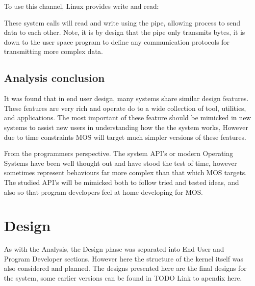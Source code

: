 \documentclass[a4paper]{report}
\begin{document}
To use this channel, Linux provides write and read: \cite{manWrite} \cite{manRead}

These system calls will read and write using the pipe, allowing process to send data to each other. Note, it is by design that the pipe only transmits bytes, it is down to the user space program to define any communication protocols for transmitting more complex data.

\section{Analysis conclusion}

It was found that in end user design, many systems share similar design features. These features are very rich and operate do to a wide collection of tool, utilities, and applications. The most important of these feature should be mimicked in new systems to assist new users in understanding how the the system works, However due to time constraints MOS will target much simpler versions of these features.

From the programmers perspective. The system API's or modern Operating Systems have been well thought out and have stood the test of time, however sometimes represent behaviours far more complex than that which MOS targets. The studied API's will be mimicked both to follow tried and tested ideas, and also so that program developers feel at home developing for MOS.


































\chapter{Design}

As with the Analysis, the Design phase was separated into End User and Program Developer sections. However here the structure of the kernel itself was also considered and planned. The designs presented here are the final designs for the system, some earlier versions can be found in TODO Link to apendix here.
\end{document}
